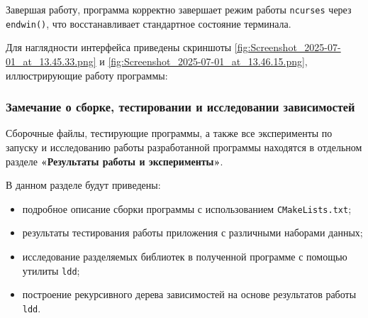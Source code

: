 Завершая работу, программа корректно завершает режим работы \texttt{ncurses} через \texttt{endwin()}, что восстанавливает стандартное состояние терминала.

\vspace{0.2cm}

Для наглядности интерфейса приведены скриншоты \ref{fig:Screenshot_2025-07-01_at_13.45.33.png} и \ref{fig:Screenshot_2025-07-01_at_13.46.15.png}, иллюстрирующие работу программы:


\subsubsection*{Замечание о сборке, тестировании и исследовании зависимостей}

Сборочные файлы, тестирующие программы, а также все эксперименты по запуску и исследованию работы разработанной программы находятся в отдельном разделе \textbf{«Результаты работы и эксперименты»}.

\vspace{0.3cm}

В данном разделе будут приведены:
\begin{itemize}
    \item подробное описание сборки программы с использованием \texttt{CMakeLists.txt};
    \item результаты тестирования работы приложения с различными наборами данных;
    \item исследование разделяемых библиотек в полученной программе с помощью утилиты \texttt{ldd};
    \item построение рекурсивного дерева зависимостей на основе результатов работы \texttt{ldd}.
\end{itemize}